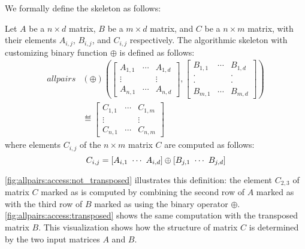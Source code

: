 We formally define the \allpairs skeleton as follows:

\begin{definition}
  \label{def:allpairs}
  Let $A$ be a $n\times d$ matrix, $B$ be a $m\times d$ matrix, and $C$ be a $n\times m$ matrix, with their elements $A_{i,j}$, $B_{i,j}$, and $C_{i,j}$ respectively.
  The algorithmic skeleton \allpairs with customizing binary function $\oplus$ is defined as follows:
  \begin{equation*}
    \begin{split}
    allpairs&(\oplus)\left(%
      \left[ \begin{array}{ccc} A_{1,1} & \cdots & A_{1,d}\\[.25em] \vdots & & \vdots\\[.25em] A_{n,1} & \cdots & A_{n,d} \end{array}\right], %
      \left[ \begin{array}{ccc} B_{1,1} & \cdots & B_{1,d}\\[-.25em] \cdot & & \cdot\\[-.75em] \cdot & & \cdot\\[-.25em] B_{m,1} & \cdots & B_{m,d} \end{array}\right]%
      \right)\\
    &\eqdef \left[ \begin{array}{ccc} C_{1,1} & \cdots & C_{1,m}\\[.25em] \vdots & & \vdots\\[.25em] C_{n,1} & \cdots & C_{n,m} \end{array} \right]
    \end{split}
  \end{equation*}
  where elements $C_{i,j}$ of the $n\times m$ matrix $C$ are computed as follows:
  \[
    C_{i,j} = \left[A_{i,1}\ \cdots\ A_{i,d}\right] \oplus \left[B_{j,1}\ \cdots\ B_{j,d}\right]
  \]
\end{definition}

\autoref{fig:allpairs:access:not_transposed} illustrates this definition:
the element $C_{2,3}$ of matrix $C$ marked as  is computed by combining the second row of $A$ marked as  with the third row of $B$ marked as  using the binary operator $\oplus$.
\autoref{fig:allpairs:access:transposed} shows the same computation with the transposed matrix $B$.
This visualization shows how the structure of matrix $C$ is determined by the two input matrices $A$ and $B$.

